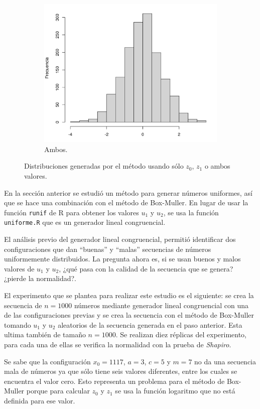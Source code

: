 \documentclass[12pt]{article}
\begin{document}
\begin{figure}
\begin{subfigure}{\textwidth}
			\includegraphics[scale=0.45]{normalambos.png}
			\caption{Ambos.}
		\end{subfigure}
	\caption{Distribuciones generadas por el método usando sólo $z_0$, $z_1$ o ambos valores.}
	\label{uno_ambos}
	\end{figure}

	En la sección anterior se estudió un método para generar números uniformes, así que se hace una combinación con el método de Box-Muller. En lugar de usar la función \texttt{runif} de \textsc{R} para obtener los valores $u_1$ y $u_2$, se usa la función \texttt{uniforme.R} que es un generador lineal congruencial.
	
	El análisis previo del generador lineal congruencial, permitió identificar dos configuraciones que dan ``buenas'' y ``malas'' secuencias de números uniformemente distribuidos. La pregunta ahora es, si se usan buenos y malos valores de $u_1$ y $u_2$, ¿qué pasa con la calidad de la secuencia que se genera? ¿pierde la normalidad?.
	
	El experimento que se plantea para realizar este estudio es el siguiente: se crea la secuencia de $n=1000$ números mediante generador lineal congruencial con una de las configuraciones previas y se crea la secuencia con el método de Box-Muller tomando $u_1$ y $u_2$ aleatorios de la secuencia generada en el paso anterior. Esta ultima también de tamaño $n=1000$. Se realizan diez réplicas del experimento, para cada una de ellas se verifica la normalidad con la prueba de {\em Shapiro}.
	
	Se sabe que la configuración $x_0 = 1117$, $a=3$, $c=5$ y $m=7$ no da una secuencia mala de números ya que sólo tiene seis valores diferentes, entre los cuales se encuentra el valor cero. Esto representa un problema para el método de Box-Muller porque para calcular $z_0$ y $z_1$ se usa la función logaritmo que no está definida para ese valor. 
	
\end{document}
